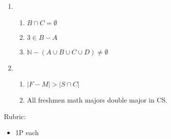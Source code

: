 \documentclass{article}
\newcommand{\N}{\mathbb{N}}
\theoremstyle{definition}
\begin{document}
\begin{solution}
\begin{enumerate}
\item 
    \begin{enumerate}
    \item $B\cap C = \emptyset$
    \item $3\in B- A$
    \item $\N -(A\cup B\cup C\cup D) \neq \emptyset$
    \end{enumerate}
\item 
    \begin{enumerate}
    \item $|F - M| > |S\cap C|$
    \item All freshmen math majors double major in CS.
    \end{enumerate}
\end{enumerate}
{\color{red} Rubric:
\begin{itemize}
\item 1P each
\end{itemize}}
\end{solution}
\end{document}
